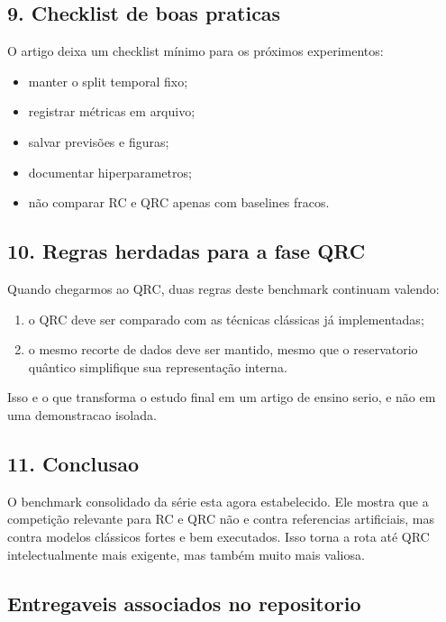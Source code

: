 \documentclass[12pt]{article}
\providecommand{\tightlist}{%
          \setlength{\itemsep}{0pt}\setlength{\parskip}{0pt}}
\begin{document}
\subsection{9. Checklist de boas praticas}\label{9-checklist-de-boas-praticas}

O artigo deixa um checklist mínimo para os próximos experimentos:

\begin{itemize}
\tightlist
\item
  manter o split temporal fixo;
\item
  registrar métricas em arquivo;
\item
  salvar previsões e figuras;
\item
  documentar hiperparametros;
\item
  não comparar RC e QRC apenas com baselines fracos.
\end{itemize}

\subsection{10. Regras herdadas para a fase QRC}\label{10-regras-herdadas-para-a-fase-qrc}

Quando chegarmos ao QRC, duas regras deste benchmark continuam valendo:

\begin{enumerate}
\def\labelenumi{\arabic{enumi}.}
\tightlist
\item
  o QRC deve ser comparado com as técnicas clássicas já implementadas;
\item
  o mesmo recorte de dados deve ser mantido, mesmo que o reservatorio quântico simplifique sua representação interna.
\end{enumerate}

Isso e o que transforma o estudo final em um artigo de ensino serio, e não em uma demonstracao isolada.

\subsection{11. Conclusao}\label{11-conclusao}

O benchmark consolidado da série esta agora estabelecido. Ele mostra que a competição relevante para RC e QRC não e contra referencias artificiais, mas contra modelos clássicos fortes e bem executados. Isso torna a rota até QRC intelectualmente mais exigente, mas também muito mais valiosa.

\subsection{Entregaveis associados no repositorio}\label{entregaveis-associados-no-repositorio}
\end{document}
